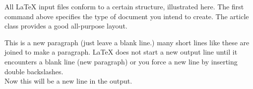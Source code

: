 \documentclass[11 pt]{article}
\begin{document}
All LaTeX input files conform to a certain structure, illustrated here.
The first command above specifies the type of document you intend to create. 
The article class provides a good all-purpose layout.

This is a new paragraph (just leave a blank line.) 
many short lines
like these
are joined to make a paragraph. LaTeX does not start a new output
line until it encounters a blank line (new paragraph) or you force
a new line by inserting double backslashes.\\ Now this will be
a new line in the output.

\end{document}
